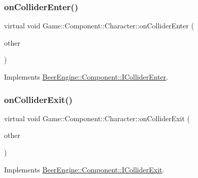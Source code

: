 \subsubsection{\texorpdfstring{on\+Collider\+Enter()}{onColliderEnter()}}
{\footnotesize\ttfamily virtual void Game\+::\+Component\+::\+Character\+::on\+Collider\+Enter (\begin{DoxyParamCaption}\item[{\mbox{\hyperlink{class_beer_engine_1_1_component_1_1_a_collider}{Beer\+Engine\+::\+Component\+::\+A\+Collider}} $\ast$}]{other }\end{DoxyParamCaption})\hspace{0.3cm}{\ttfamily [virtual]}}



Implements \mbox{\hyperlink{class_beer_engine_1_1_component_1_1_i_collider_enter_a2b1d3e4210b12de57f70368a8a9b6686}{Beer\+Engine\+::\+Component\+::\+I\+Collider\+Enter}}.

\mbox{\label{class_game_1_1_component_1_1_character_afe4232175cd33c92027adacba5217b16}} 
\subsubsection{\texorpdfstring{on\+Collider\+Exit()}{onColliderExit()}}
{\footnotesize\ttfamily virtual void Game\+::\+Component\+::\+Character\+::on\+Collider\+Exit (\begin{DoxyParamCaption}\item[{\mbox{\hyperlink{class_beer_engine_1_1_component_1_1_a_collider}{Beer\+Engine\+::\+Component\+::\+A\+Collider}} $\ast$}]{other }\end{DoxyParamCaption})\hspace{0.3cm}{\ttfamily [virtual]}}



Implements \mbox{\hyperlink{class_beer_engine_1_1_component_1_1_i_collider_exit_a3669477d0003535fbe0411449efc69e9}{Beer\+Engine\+::\+Component\+::\+I\+Collider\+Exit}}.

\mbox{\label{class_game_1_1_component_1_1_character_afdb1ebc07baa1a95840af9dfb48d9348}} 
